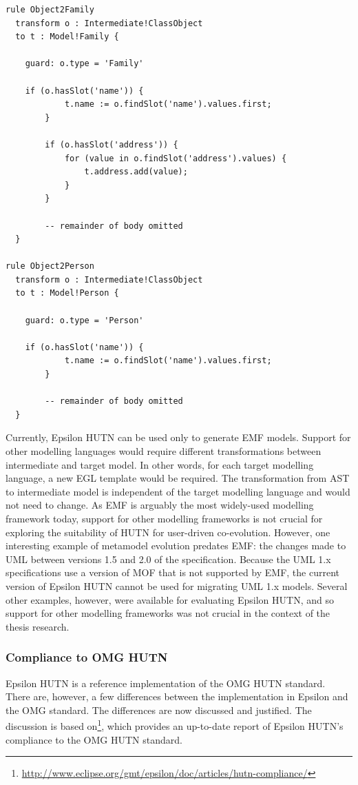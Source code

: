 \begin{lstlisting}[caption=The M2M transformation generated for the Families metamodel, label=lst:hutn_generated_transformation, language=ETL, float=tb]
rule Object2Family
  transform o : Intermediate!ClassObject
  to t : Model!Family {

    guard: o.type = 'Family'

    if (o.hasSlot('name')) {
			t.name := o.findSlot('name').values.first;
		}
		
		if (o.hasSlot('address')) {
			for (value in o.findSlot('address').values) {
				t.address.add(value);
			}
		}
		
		-- remainder of body omitted
  }

rule Object2Person
  transform o : Intermediate!ClassObject
  to t : Model!Person {

    guard: o.type = 'Person'

    if (o.hasSlot('name')) {
			t.name := o.findSlot('name').values.first;
		}
		
		-- remainder of body omitted
  }
\end{lstlisting}

Currently, Epsilon HUTN can be used only to generate EMF models. Support for other modelling languages would require different transformations between intermediate and target model. In other words, for each target modelling language, a new EGL template would be required. The transformation from AST to intermediate model is independent of the target modelling language and would not need to change. As EMF is arguably the most widely-used modelling framework today, support for other modelling frameworks is not crucial for exploring the suitability of HUTN for user-driven co-evolution. However, one interesting example of metamodel evolution predates EMF: the changes made to UML between versions 1.5 and 2.0 of the specification. Because the UML 1.x specifications use a version of MOF that is not supported by EMF, the current version of Epsilon HUTN cannot be used for migrating UML 1.x models. Several other examples, however, were available for evaluating Epsilon HUTN, and so support for other modelling frameworks was not crucial in the context of the thesis research.

\subsubsection{Compliance to OMG HUTN}
Epsilon HUTN is a reference implementation of the OMG HUTN standard. There are, however, a few differences between the implementation in Epsilon and the OMG standard. The differences are now discussed and justified. The discussion is based on\footnote{\url{http://www.eclipse.org/gmt/epsilon/doc/articles/hutn-compliance/}}, which provides an up-to-date report of Epsilon HUTN's compliance to the OMG HUTN standard.

